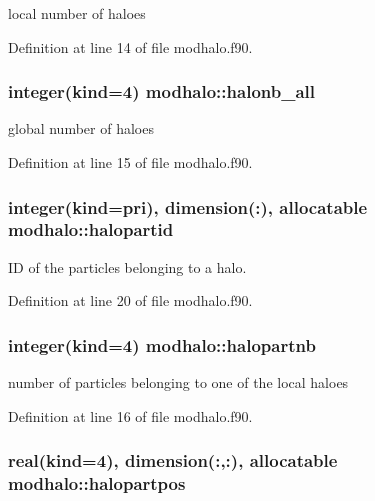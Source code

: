 local number of haloes 



Definition at line 14 of file modhalo.\-f90.

\hypertarget{classmodhalo_a8e5ab9d4d7316b9c26af34ac45a088ef}{
\subsubsection[{halonb\-\_\-all}]{\setlength{\rightskip}{0pt plus 5cm}integer(kind=4) modhalo\-::halonb\-\_\-all}}\label{classmodhalo_a8e5ab9d4d7316b9c26af34ac45a088ef}


global number of haloes 



Definition at line 15 of file modhalo.\-f90.

\hypertarget{classmodhalo_a6c47abc5102dc629247c7b90831b1030}{
\subsubsection[{halopartid}]{\setlength{\rightskip}{0pt plus 5cm}integer(kind=pri), dimension(\-:), allocatable modhalo\-::halopartid}}\label{classmodhalo_a6c47abc5102dc629247c7b90831b1030}


I\-D of the particles belonging to a halo. 



Definition at line 20 of file modhalo.\-f90.

\hypertarget{classmodhalo_a026b99d5d7dc52fa2755b516c9947514}{
\subsubsection[{halopartnb}]{\setlength{\rightskip}{0pt plus 5cm}integer(kind=4) modhalo\-::halopartnb}}\label{classmodhalo_a026b99d5d7dc52fa2755b516c9947514}


number of particles belonging to one of the local haloes 



Definition at line 16 of file modhalo.\-f90.

\hypertarget{classmodhalo_a935d49a97e72fe931ab0e2cee84d1523}{
\subsubsection[{halopartpos}]{\setlength{\rightskip}{0pt plus 5cm}real(kind=4), dimension(\-:,\-:), allocatable modhalo\-::halopartpos}}\label{classmodhalo_a935d49a97e72fe931ab0e2cee84d1523}



